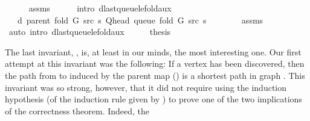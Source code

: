 \begin{isabellebody}
\ \ \ \ \isamarkupfalse%
\ assms\isanewline
\ \ \ \ \isamarkupfalse%
\ {\isacharparenleft}{\kern0pt}intro\ d{\isacharunderscore}{\kern0pt}last{\isacharunderscore}{\kern0pt}queue{\isacharunderscore}{\kern0pt}le{\isacharunderscore}{\kern0pt}fold{\isacharunderscore}{\kern0pt}aux{\isacharparenright}{\kern0pt}\isanewline
\ \ \isamarkupfalse%
\ \isamarkupfalse%
\ {\isachardoublequoteopen}{\isachardot}{\kern0pt}{\isachardot}{\kern0pt}{\isachardot}{\kern0pt}\ {\isasymle}\ d\ {\isacharparenleft}{\kern0pt}parent\ {\isacharparenleft}{\kern0pt}fold\ G\ src\ s{\isacharparenright}{\kern0pt}{\isacharparenright}{\kern0pt}\ {\isacharparenleft}{\kern0pt}Q{\isacharunderscore}{\kern0pt}head\ {\isacharparenleft}{\kern0pt}queue\ {\isacharparenleft}{\kern0pt}fold\ G\ src\ s{\isacharparenright}{\kern0pt}{\isacharparenright}{\kern0pt}{\isacharparenright}{\kern0pt}\ {\isacharplus}{\kern0pt}\ {}{\isachardoublequoteclose}\isanewline
\ \ \ \ \isamarkupfalse%
\ assms\isanewline
\ \ \ \ \isamarkupfalse%
\ {\isacharparenleft}{\kern0pt}auto\ intro{\isacharcolon}{\kern0pt}\ d{\isacharunderscore}{\kern0pt}last{\isacharunderscore}{\kern0pt}queue{\isacharunderscore}{\kern0pt}le{\isacharunderscore}{\kern0pt}fold{\isacharunderscore}{\kern0pt}aux{\isacharunderscore}{\kern0pt}{}{\isacharparenright}{\kern0pt}\isanewline
\ \ \isamarkupfalse%
\ \isamarkupfalse%
\ {\isacharquery}{\kern0pt}thesis\isanewline
\ \ \ \ \isacommand{{\isachardot}{\kern0pt}}\isamarkupfalse%
\isanewline
{}\isamarkupfalse%
%
\endisatagproof
{\isafoldproof}%
%
\isadelimproof
%
\endisadelimproof
%
\begin{isamarkuptext}%
The last invariant, , is, at least in our minds, the most
interesting one. Our first attempt at this invariant was the following: If a vertex  has
been discovered, then the path from  to  induced by the parent map
() is a shortest path in graph . This invariant was so
strong, however, that it did not require using the induction hypothesis (of the induction rule given
by ) to prove one of the two implications of the correctness theorem. Indeed, the

\end{isamarkuptext}
\end{isabellebody}
